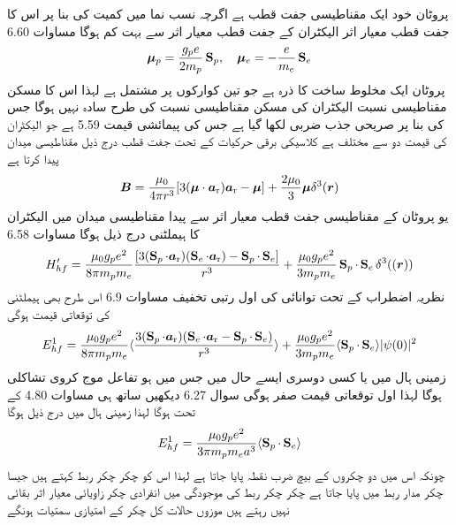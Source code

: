پروٹان خود ایک مقناطیسی جفت قطب  ہے اگرچہ نسب نما میں کمیت کی بنا پر اس کا جفت قطب معیار اثر الیکٹران کے جفت قطب معیار اثر سے بہت کم ہوگا مساوات 6.60 
\begin{align}
{\ensuremath{{\boldsymbol{\mu}}}}_p = \frac{g_p e}{2 m_p} \operatorname{\mathbf{S}}_p, \quad {\ensuremath{{\boldsymbol{\mu}}}}_e = - \frac{e}{m_e} \operatorname{\mathbf{S}}_e
\end{align}
پروٹان ایک مخلوط ساخت کا ذرہ ہے جو تین کوارکوں پر مشتمل ہے لہذا اس کا مسکن مقناطیسی نسبت الیکٹران کی مسکن مقناطیسی نسبت کی طرح سادہ نہیں ہوگا جس کی بنا پر  صريحى  جذب ضربی  لکھا گیا ہے جس کی پیمائشی قیمت 5.59 ہے جو الیکٹران کی قیمت دو سے مختلف ہے کلاسیکی برقی حرکیات کے تحت جفت قطب   درج ذیل مقناطیسی میدان پیدا کرتا ہے 
\begin{align}
{\ensuremath{{\boldsymbol{B}}}} = \frac{\mu_0}{4 \pi r^3} [3 ({{\boldsymbol{\mu}}} \cdot {\ensuremath{{\boldsymbol{a}}}_{\textup{r}}}) {{\boldsymbol{a}}_{\textup{r}}} - {{\boldsymbol{\mu}}}] + \frac{2 \mu_0}{3} {{\boldsymbol{\mu}}} \delta^3 ({{\boldsymbol{r}}})
\end{align}
یو پروٹان کے مقناطیسی جفت قطب معیار اثر سے پیدا مقناطیسی میدان میں الیکٹران کا ہیملٹنی درج ذیل ہوگا مساوات 6.58 
\begin{align}
H'_{hf} = \frac{\mu_0 g_p e^2}{8 \pi m_p m_e} \frac{[3(\operatorname{\mathbf{S}}_p \cdot {\ensuremath{{\boldsymbol{a}}}_{\textup{r}}})(\operatorname{\mathbf{S}}_e \cdot {\ensuremath{{\boldsymbol{a}}}_{\textup{r}}}) - \operatorname{\mathbf{S}}_p \cdot \operatorname{\mathbf{S}}_e]}{r^3} + \frac{\mu_0 g_p e^2}{3m_p m_e} \operatorname{\mathbf{S}}_p \cdot \operatorname{\mathbf{S}}_e \delta^3 (({{\boldsymbol{r}}}))
\end{align}
نظریہ اضطراب کے تحت توانائی کی اول رتبی تخفیف مساوات 6.9 اس طرح بھی ہيملٹنی کی توقعاتی قیمت ہوگی 
\begin{align}
E_{hf}^1 = \frac{\mu_0 g_p e^2}{8 \pi m_p m_e} \langle \frac{3(\operatorname{\mathbf{S}}_p \cdot {\ensuremath{{\boldsymbol{a}}}_{\textup{r}}})(\operatorname{\mathbf{S}}_e \cdot {\ensuremath{{\boldsymbol{a}}}_{\textup{r}}} - \operatorname{\mathbf{S}}_p \cdot \operatorname{\mathbf{S}}_e)}{r^3} \rangle + \frac{\mu _0 g_p e^2}{3 m_p m_e} \langle \operatorname{\mathbf{S}}_p \cdot \operatorname{\mathbf{S}}_e \rangle |\psi (0)|^2
\end{align}
زمینی ہال میں یا کسی دوسری ایسے حال میں جس میں  ہو تفاعل موج کروی تشاکلی ہوگا لہذا اول توقعاتی قیمت صفر ہوگی سوال 6.27 دیکھیں ساتھ ہی مساوات 4.80 کے تحت  ہوگا لہذا زمینی ہال میں درج ذیل ہوگا 
\begin{align}
E_{hf}^1 = \frac{\mu_0 g_p e^2}{3 \pi m_p m_e a^3} \langle \operatorname{\mathbf{S}}_p \cdot \operatorname{\mathbf{S}}_e \rangle
\end{align}
چونکہ اس میں دو چکروں کے بیچ ضرب نقطہ پایا جاتا ہے لہذا اس کو چکر چکر ربط کہتے ہیں جیسا چکر مدار ربط میں  پایا جاتا ہے چکر چکر ربط کی موجودگی میں انفرادی چکر زاویائی معیار اثر بقائی نہیں رہتے ہیں موزوں حالات کل چکر کے امتیازی سمتیات ہونگے 
